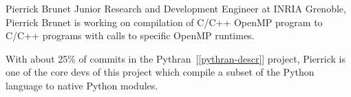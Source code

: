 \begin{participant}[type=R,PM=12,gender=male]{Pierrick Brunet}
  Junior Research and Development Engineer at INRIA Grenoble, Pierrick Brunet is working
  on compilation of C/C++ OpenMP program to C/C++ programs with calls to specific OpenMP
  runtimes.

  With about 25\% of commits in the Pythran~[\ref{pythran-descr}] project, Pierrick is one of the core devs of
  this project which compile a subset of the Python language to native Python modules.

\end{participant}
